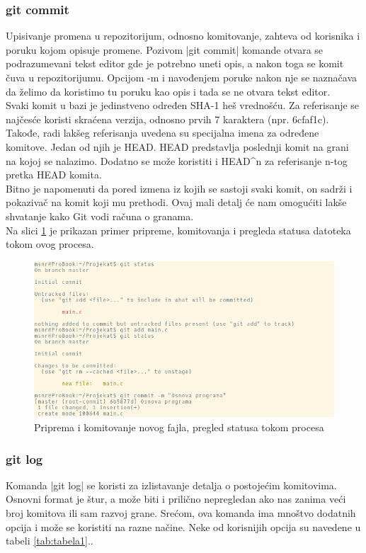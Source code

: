 \documentclass[a4paper]{article}
\begin{document}
{\subsubsection*{git commit}
\label{subsec:git_commit}
Upisivanje promena u repozitorijum, odnosno komitovanje, zahteva od korisnika i poruku kojom opisuje promene. Pozivom |git commit| komande otvara se podrazumevani tekst editor gde je potrebno uneti opis, a nakon toga se komit čuva u repozitorijumu. Opcijom -m i navođenjem poruke nakon nje se naznačava da želimo da koristimo tu poruku kao opis i tada se ne otvara tekst editor.
\\
Svaki komit u bazi je jedinstveno određen SHA-1 heš vrednošću. Za referisanje se najčesće koristi skraćena verzija, odnosno prvih 7 karaktera (npr. 6cfaf1c).
Takođe, radi lakšeg referisanja uvedena su specijalna imena za određene komitove. Jedan od njih je HEAD. HEAD predstavlja poslednji komit na grani na kojoj se nalazimo. Dodatno se može koristiti i HEAD\^{}n za referisanje n-tog pretka HEAD komita.\\
Bitno je napomenuti da pored izmena iz kojih se sastoji svaki komit, on sadrži i pokazivač na komit koji mu prethodi. Ovaj mali detalj će nam omogućiti lakše shvatanje kako Git vodi računa o granama.\\
Na slici \ref{fig:git_commit} je prikazan primer pripreme, komitovanja i pregleda statusa datoteka tokom ovog procesa.


\begin{figure}[h!]
\begin{center}
\includegraphics[scale=0.55]{images/commit.png}
\end{center}
\caption{Priprema i komitovanje novog fajla, pregled statusa tokom procesa}
\label{fig:git_commit}
\end{figure}

\subsubsection*{git log}
\label{log}
Komanda |git log| se koristi za izlistavanje detalja o postojećim komitovima. Osnovni format je štur, a može biti i prilično nepregledan ako nas zanima veći broj komitova ili sam razvoj grane. Srećom, ova komanda ima mnoštvo dodatnih opcija i može se koristiti na razne načine. Neke od korisnijih opcija su navedene u tabeli \ref{tab:tabela1}.. 

}
\end{document}
